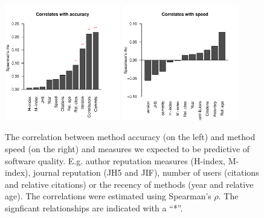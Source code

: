 \documentclass[fleqn,10pt]{SelfArx} %
\begin{document}
\begin{figure}[H]
\centering
\includegraphics[width=0.45\textwidth]{spearmanBarplot.pdf}
\includegraphics[width=0.45\textwidth]{spearmanBarplotSpeed.pdf}
\caption{The correlation between method accuracy (on the left) and
  method speed (on the right) and measures we expected to be
  predictive of software quality. E.g. author reputation measures
  (H-index, M-index), journal reputation (JH5 and JIF), number of
  users (citations and relative citations) or the recency of methods
  (year and relative age).  The correlations were estimated using
  Spearman's $\rho$. The signficant relationships are indicated with a
  ``*''. }
\label{fig:S2}
\end{figure}


\end{document}
